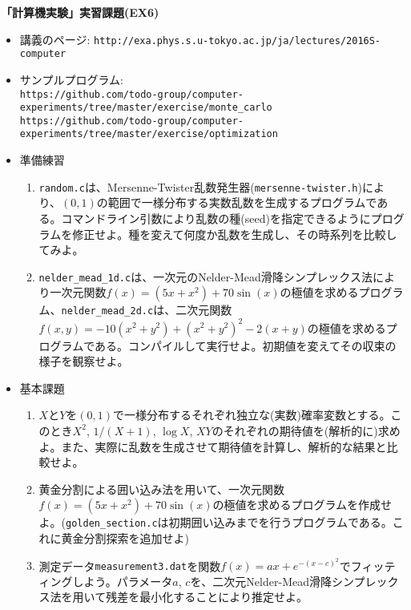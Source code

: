 \documentclass[11pt]{jarticle}
\begin{document}
\noindent
{\bf\large 「計算機実験」実習課題(EX6)}
\\[-0.5em]

\noindent
\begin{itemize}
\item 講義のページ: \verb+http://exa.phys.s.u-tokyo.ac.jp/ja/lectures/2016S-computer+

\item サンプルプログラム: \\ {\small \verb+https://github.com/todo-group/computer-experiments/tree/master/exercise/monte_carlo+} \\ {\small \verb+https://github.com/todo-group/computer-experiments/tree/master/exercise/optimization+}
  
\item 準備練習
  \begin{enumerate}
  \item {\tt random.c}は、Mersenne-Twister乱数発生器({\tt mersenne-twister.h})により、$(0,1)$の範囲で一様分布する実数乱数を生成するプログラムである。コマンドライン引数により乱数の種(seed)を指定できるようにプログラムを修正せよ。種を変えて何度か乱数を生成し、その時系列を比較してみよ。
  \item {\tt nelder\_mead\_1d.c}は、一次元のNelder-Mead滑降シンプレックス法により一次元関数$f(x)=(5x+x^2)+70\sin(x)$の極値を求めるプログラム、{\tt nelder\_mead\_2d.c}は、二次元関数$f(x,y)=-10(x^2+y^2)+(x^2+y^2)^2-2(x+y)$の極値を求めるプログラムである。コンパイルして実行せよ。初期値を変えてその収束の様子を観察せよ。
  \end{enumerate}

\item 基本課題
  \begin{enumerate}
  \item $X$と$Y$を$(0,1)$で一様分布するそれぞれ独立な(実数)確率変数とする。このとき$X^2$, $1/(X+1)$, $\log X$, $XY$のそれぞれの期待値を(解析的に)求めよ。また、実際に乱数を生成させて期待値を計算し、解析的な結果と比較せよ。
  \item 黄金分割による囲い込み法を用いて、一次元関数$f(x)=(5x+x^2)+70\sin(x)$の極値を求めるプログラムを作成せよ。({\tt golden\_section.c}は初期囲い込みまでを行うプログラムである。これに黄金分割探索を追加せよ)
  \item 測定データ{\tt measurement3.dat}を関数$f(x)=ax+e^{-(x-c)^2}$でフィッティングしよう。パラメータ$a$, $c$を、二次元Nelder-Mead滑降シンプレックス法を用いて残差を最小化することにより推定せよ。
  \end{enumerate}
  

\end{itemize}
\end{document}
